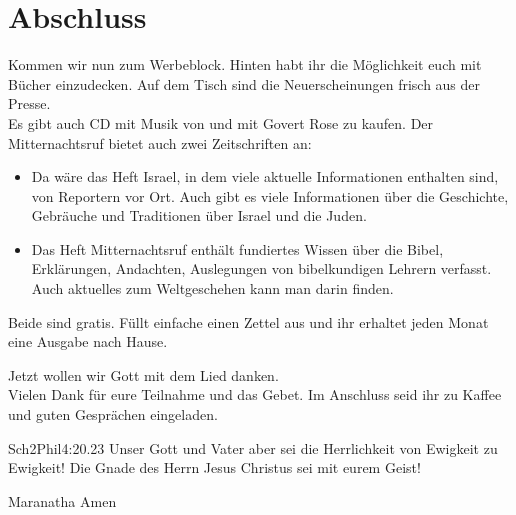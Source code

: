 \documentclass{../inc/mybib}
\begin{document}
\section{Abschluss}
Kommen wir nun zum Werbeblock. Hinten habt ihr die Möglichkeit euch mit Bücher einzudecken. Auf dem Tisch sind die Neuerscheinungen frisch aus der Presse.\\
Es gibt auch CD mit Musik von und mit Govert Rose zu kaufen.
Der Mitternachtsruf bietet auch zwei Zeitschriften an:
\begin{itemize}
    \item Da wäre das Heft Israel, in dem viele aktuelle Informationen enthalten sind, von Reportern vor Ort. Auch gibt es viele Informationen über die Geschichte, Gebräuche und Traditionen über Israel und die Juden.
    \item Das Heft Mitternachtsruf enthält fundiertes Wissen über die Bibel, Erklärungen, Andachten, Auslegungen von bibelkundigen Lehrern verfasst. Auch aktuelles zum Weltgeschehen kann man darin finden.
\end{itemize}
Beide sind gratis. Füllt einfache einen Zettel aus und ihr erhaltet jeden Monat eine Ausgabe nach Hause.

Jetzt wollen wir Gott mit dem Lied  danken.\\
Vielen Dank für eure Teilnahme und das Gebet. Im Anschluss seid ihr zu Kaffee und guten Gesprächen eingeladen.
\beten{} \\

\begin{bibeltext}{Sch2}{Phil}{4:20.23}
Unser Gott und Vater aber sei die Herrlichkeit von Ewigkeit zu Ewigkeit!
Die Gnade des Herrn Jesus Christus sei mit eurem Geist!
\end{bibeltext}
Maranatha Amen
\end{document}

